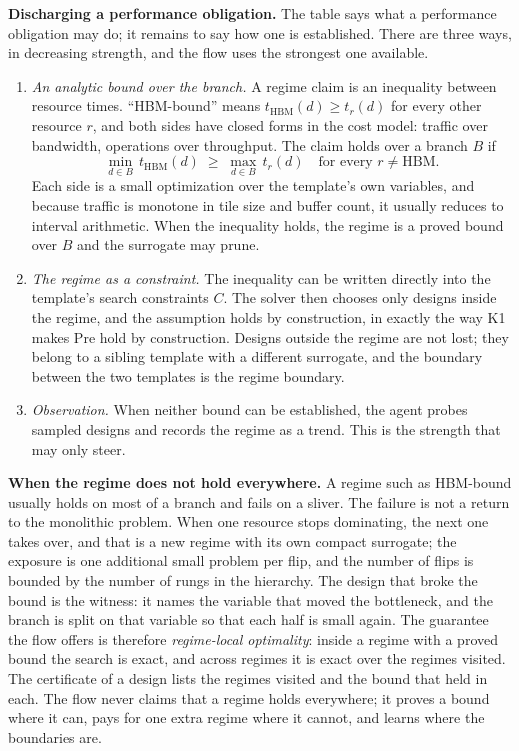 \documentclass[11pt]{article}
\providecommand{\tightlist}{\setlength{\itemsep}{0pt}\setlength{\parskip}{0pt}}
\begin{document}
\textbf{Discharging a performance obligation.} The table says what a performance obligation may do; it remains to say how one is established. There are three ways, in decreasing strength, and the flow uses the strongest one available.

\begin{enumerate}
\def\labelenumi{\arabic{enumi}.}
\tightlist
\item
  \emph{An analytic bound over the branch.} A regime claim is an inequality between resource times. ``HBM-bound'' means \(t_{\mathrm{HBM}}(d)\ge t_r(d)\) for every other resource \(r\), and both sides have closed forms in the cost model: traffic over bandwidth, operations over throughput. The claim holds over a branch \(B\) if
  \[
  \min_{d\in B}\,t_{\mathrm{HBM}}(d)\;\ge\;\max_{d\in B}\,t_r(d)\quad\text{for every }r\neq\mathrm{HBM}.
  \]
  Each side is a small optimization over the template's own variables, and because traffic is monotone in tile size and buffer count, it usually reduces to interval arithmetic. When the inequality holds, the regime is a proved bound over \(B\) and the surrogate may prune.
\item
  \emph{The regime as a constraint.} The inequality can be written directly into the template's search constraints \(C\). The solver then chooses only designs inside the regime, and the assumption holds by construction, in exactly the way K1 makes \(\mathrm{Pre}\) hold by construction. Designs outside the regime are not lost; they belong to a sibling template with a different surrogate, and the boundary between the two templates is the regime boundary.
\item
  \emph{Observation.} When neither bound can be established, the agent probes sampled designs and records the regime as a trend. This is the strength that may only steer.
\end{enumerate}

\textbf{When the regime does not hold everywhere.} A regime such as HBM-bound usually holds on most of a branch and fails on a sliver. The failure is not a return to the monolithic problem. When one resource stops dominating, the next one takes over, and that is a new regime with its own compact surrogate; the exposure is one additional small problem per flip, and the number of flips is bounded by the number of rungs in the hierarchy. The design that broke the bound is the witness: it names the variable that moved the bottleneck, and the branch is split on that variable so that each half is small again. The guarantee the flow offers is therefore \emph{regime-local optimality}: inside a regime with a proved bound the search is exact, and across regimes it is exact over the regimes visited. The certificate of a design lists the regimes visited and the bound that held in each. The flow never claims that a regime holds everywhere; it proves a bound where it can, pays for one extra regime where it cannot, and learns where the boundaries are.
\end{document}
